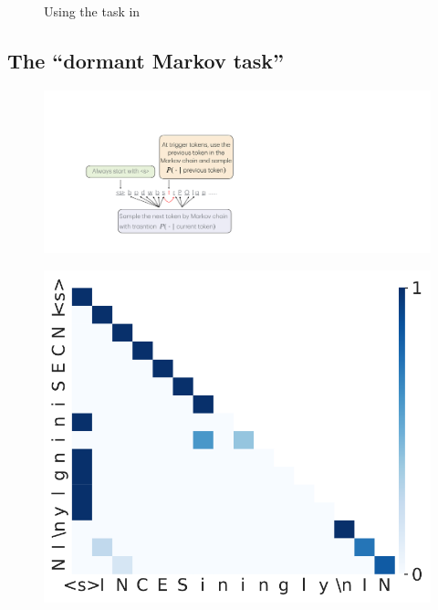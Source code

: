 \begin{figure}
\begin{minipage}{0.45\textwidth}
  \end{minipage}
  \vspace{-1em}
  \caption{\small Using the task in \citet{bietti2024birth}}
  \label{figure:appendix-pretraining-biette-findings-3}
  \vspace{-1em}
\end{figure}

\subsection{The ``dormant Markov task''}
\begin{figure}[t]
  \centering
  \begin{minipage}{0.4\textwidth}
      \centering
      \label{fig:appendix-pretraining-dgp-dormant-markov}
      \vspace{-.2em}
      \includegraphics[width=\linewidth]{Figures/figures_pretraining/dormant_markov.pdf}
  \end{minipage}
  \hspace{-1em}
  \begin{minipage}{0.3\textwidth}
      \centering
      \label{fig:appendix-dormant-markov-attn-weights-dormant}
      \vspace{-.2em}
      \includegraphics[width=\linewidth]{Figures/figures_pretraining/dormant_markov/dormant_markov_attn_weights_seq0.pdf}

\end{minipage}
\end{figure}
